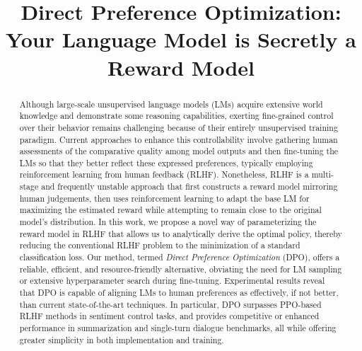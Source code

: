 \title{Direct Preference Optimization: Your Language Model is Secretly a Reward Model}

\begin{abstract}
Although large-scale unsupervised language models (LMs) acquire extensive world knowledge and demonstrate some reasoning capabilities, exerting fine-grained control over their behavior remains challenging because of their entirely unsupervised training paradigm. Current approaches to enhance this controllability involve gathering human assessments of the comparative quality among model outputs and then fine-tuning the LMs so that they better reflect these expressed preferences, typically employing reinforcement learning from human feedback (RLHF). Nonetheless, RLHF is a multi-stage and frequently unstable approach that first constructs a reward model mirroring human judgements, then uses reinforcement learning to adapt the base LM for maximizing the estimated reward while attempting to remain close to the original model’s distribution. In this work, we propose a novel way of parameterizing the reward model in RLHF that allows us to analytically derive the optimal policy, thereby reducing the conventional RLHF problem to the minimization of a standard classification loss. Our method, termed \textit{Direct Preference Optimization} (DPO), offers a reliable, efficient, and resource-friendly alternative, obviating the need for LM sampling or extensive hyperparameter search during fine-tuning. Experimental results reveal that DPO is capable of aligning LMs to human preferences as effectively, if not better, than current state-of-the-art techniques. In particular, DPO surpasses PPO-based RLHF methods in sentiment control tasks, and provides competitive or enhanced performance in summarization and single-turn dialogue benchmarks, all while offering greater simplicity in both implementation and training.
\end{abstract}

